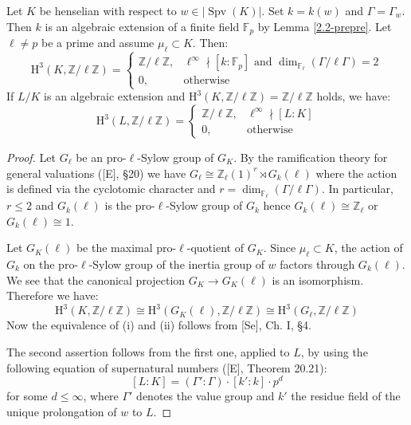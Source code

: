 \begin{lemma}\label{2.5}
Let $K$ be henselian with respect to $w\in|\operatorname{Spv}(K)|$. Set $k=k(w)$ and $\Gamma = \Gamma_w$. Then $k$ is an algebraic extension of a finite field $\mathbb{F}_p$ by Lemma \ref{2.2-prepre}. Let $\ell\neq p$ be a prime and assume $\mu_\ell\subset K$. Then:
\[ \mathrm{H}^3(K, \mathbb{Z}/\ell\mathbb{Z}) = \begin{cases}
\mathbb{Z}/\ell\mathbb{Z}, & \ell^\infty\nmid [k:\mathbb{F}_p] \text{ and } \dim_{\mathbb{F}_\ell}(\Gamma / \ell\Gamma) = 2\\
0, & \text{otherwise}
\end{cases} \]
If $L/K$ is an algebraic extension and $\mathrm{H}^3(K, \mathbb{Z}/\ell\mathbb{Z}) = \mathbb{Z}/\ell\mathbb{Z}$ holds, we have:
\[ \mathrm{H}^3(L,\mathbb{Z}/\ell\mathbb{Z}) = \begin{cases}
\mathbb{Z}/\ell\mathbb{Z}, & \ell^\infty\nmid [L:K]\\
0, & \text{otherwise}
\end{cases} \]
\end{lemma}

\begin{proof}
Let $G_\ell$ be an pro-$\ell$-Sylow group of $G_K$. By the ramification theory for general valuations ([E], §20) we have $G_\ell\cong\mathbb{Z}_\ell(1)^r\rtimes G_k(\ell)$ where the action is defined via the cyclotomic character and $r = \dim_{\mathbb{F}_\ell}(\Gamma/\ell\Gamma)$. In particular, $r\leq 2$ and $G_k(\ell)$ is the pro-$\ell$-Sylow group of $G_k$ hence $G_k(\ell)\cong \mathbb{Z}_\ell$ or $G_k(\ell) \cong 1$.

Let $G_K(\ell)$ be the maximal pro-$\ell$-quotient of $G_K$. Since $\mu_\ell\subset K$, the action of $G_k$ on the pro-$\ell$-Sylow group of the inertia group of $w$ factors through $G_k(\ell)$. We see that the canonical projection $G_K\to G_K(\ell)$ is an isomorphism. Therefore we have:
\[ \mathrm{H}^3(K,\mathbb{Z}/\ell\mathbb{Z}) \cong\mathrm{H}^3(G_K(\ell),\mathbb{Z}/\ell\mathbb{Z}) \cong\mathrm{H}^3(G_\ell,\mathbb{Z}/\ell\mathbb{Z}) \]
Now the equivalence of (i) and (ii) follows from [Se], Ch. I, §4.

The second assertion follows from the first one, applied to $L$, by using the following equation of supernatural numbers ([E], Theorem 20.21):
\[ [L:K] = (\Gamma':\Gamma) \cdot [k':k]\cdot p^d \]
for some $d \leq \infty$, where $\Gamma'$ denotes the value group and $k'$ the residue field of the unique prolongation of $w$ to $L$.
\end{proof}

